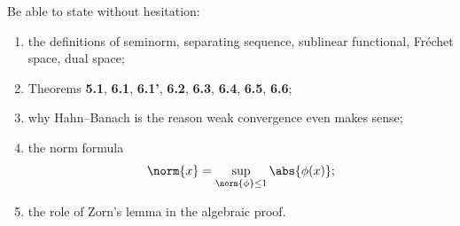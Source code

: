 \documentclass[header={Lecture 3 Exam Study Notes}]{study-note}
\begin{document}
\begin{focusbox}
Be able to state without hesitation:
\begin{enumerate}
\item the definitions of seminorm, separating sequence, sublinear functional, Fr\'echet space, dual space;
\item Theorems \textbf{5.1}, \textbf{6.1}, \textbf{6.1'}, \textbf{6.2}, \textbf{6.3}, \textbf{6.4}, \textbf{6.5}, \textbf{6.6};
\item why Hahn--Banach is the reason weak convergence even makes sense;
\item the norm formula
\[
\norm{x}=\sup_{\norm{\phi}\le 1}\abs{\phi(x)};
\]
\item the role of Zorn's lemma in the algebraic proof.
\end{enumerate}
\end{focusbox}
\end{document}
